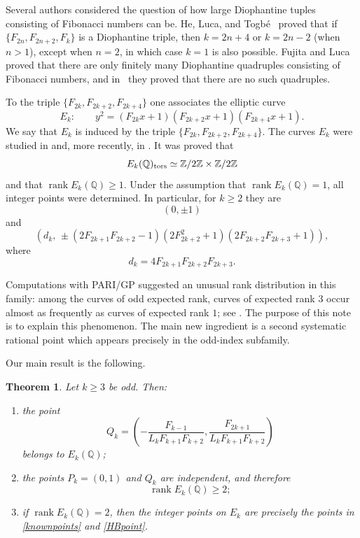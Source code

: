 \documentclass[11pt]{amsart}
\newtheorem{theorem}{Theorem}[section]
\theoremstyle{remark}
\newcommand{\Q}{\mathbb{Q}}
\newcommand{\Z}{\mathbb{Z}}
\begin{document}
Several authors considered the question of how large Diophantine tuples consisting of Fibonacci numbers can be.
He, Luca, and Togb\'e~\cite{HLT} proved that if $\{F_{2n}, F_{2n+2}, F_k\}$ is a Diophantine triple, 
then $k = 2n+4$ or $k = 2n - 2$ (when $n > 1$), except when $n = 2$, in which case $k = 1$ is also possible. 
Fujita and Luca~\cite{FL} proved that there are only finitely many Diophantine quadruples consisting of Fibonacci numbers, and in~\cite{FL2} they proved that there are no such quadruples.

To the triple $\{F_{2k},F_{2k+2},F_{2k+4}\}$ one associates the elliptic curve
\begin{equation}\label{Ek}
 E_k:\qquad
 y^2=(F_{2k}x+1)(F_{2k+2}x+1)(F_{2k+4}x+1).
\end{equation} 
We say that $E_k$ is induced by the triple $\{F_{2k},F_{2k+2},F_{2k+4}\}$.  
The curves $E_k$ were studied in \cite{DujellaMT} and, more recently, in
\cite[Sections 4.8-4.9]{DujellaBook}.  It was proved that
\[
 E_k(\Q)_{\rm tors}\simeq \Z/2\Z\times\Z/2\Z
\]
and that $\operatorname{rank}E_k(\Q)\geq 1$.  Under the assumption that 
$\operatorname{rank}E_k(\Q)=1$, all integer points were determined.
In particular, for $k\geq2$ they are
\begin{equation}\label{knownpoints}
 (0,\pm1)
\end{equation}
and
\begin{equation}\label{HBpoint}
 \left(
 d_k,\,
 \pm(2F_{2k+1}F_{2k+2}-1)
 (2F_{2k+2}^2+1)
 (2F_{2k+2}F_{2k+3}+1)
 \right),
\end{equation}
where
\[
 d_k=4F_{2k+1}F_{2k+2}F_{2k+3}.
\]

Computations with PARI/GP suggested an unusual rank distribution in this
family: among the curves of odd expected rank, curves of expected rank
$3$ occur almost as frequently as curves of expected rank $1$; see
\cite[Remark 4.9.5]{DujellaBook}.  The purpose of this note is to explain
this phenomenon.  The main new ingredient is a second systematic rational
point which appears precisely in the odd-index subfamily.

Our main result is the following.

\begin{theorem}\label{main}
Let $k\geq3$ be odd. Then:
\begin{enumerate}[label={\rm (\roman*)}]
\item the point
\[
 Q_k=\left(
 -\frac{F_{k-1}}{L_kF_{k+1}F_{k+2}},
 \frac{F_{2k+1}}{L_kF_{k+1}F_{k+2}}
 \right)
\]
belongs to $E_k(\Q)$;
\item the points $P_k=(0,1)$ and $Q_k$ are independent, and therefore
\[
 \operatorname{rank}E_k(\Q)\geq2;
\]
\item if $\operatorname{rank}E_k(\Q)=2$, then the integer points on
$E_k$ are precisely the points in \eqref{knownpoints} and
\eqref{HBpoint}.
\end{enumerate}
\end{theorem}
\end{document}
